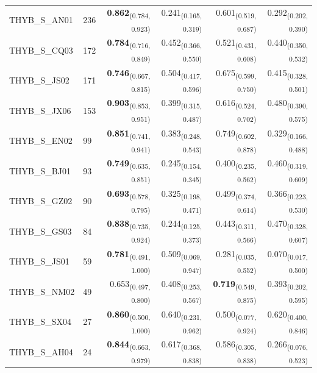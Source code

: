 \begin{table}[p]
\begin{tabular}{llrrrr}
THYB\_S\_AN01 & 236 & \textbf{0.862}\textsubscript{(0.784, 0.923)} & 0.241\textsubscript{(0.165, 0.319)} & 0.601\textsubscript{(0.519, 0.687)} & 0.292\textsubscript{(0.202, 0.390)} \\
THYB\_S\_CQ03 & 172 & \textbf{0.784}\textsubscript{(0.716, 0.849)} & 0.452\textsubscript{(0.366, 0.550)} & 0.521\textsubscript{(0.431, 0.608)} & 0.440\textsubscript{(0.350, 0.532)} \\
THYB\_S\_JS02 & 171 & \textbf{0.746}\textsubscript{(0.667, 0.815)} & 0.504\textsubscript{(0.417, 0.596)} & 0.675\textsubscript{(0.599, 0.750)} & 0.415\textsubscript{(0.328, 0.501)} \\
THYB\_S\_JX06 & 153 & \textbf{0.903}\textsubscript{(0.853, 0.951)} & 0.399\textsubscript{(0.315, 0.487)} & 0.616\textsubscript{(0.524, 0.702)} & 0.480\textsubscript{(0.390, 0.575)} \\
THYB\_S\_EN02 & 99 & \textbf{0.851}\textsubscript{(0.741, 0.941)} & 0.383\textsubscript{(0.248, 0.543)} & 0.749\textsubscript{(0.602, 0.878)} & 0.329\textsubscript{(0.166, 0.488)} \\
THYB\_S\_BJ01 & 93 & \textbf{0.749}\textsubscript{(0.635, 0.851)} & 0.245\textsubscript{(0.154, 0.345)} & 0.400\textsubscript{(0.235, 0.562)} & 0.460\textsubscript{(0.319, 0.609)} \\
THYB\_S\_GZ02 & 90 & \textbf{0.693}\textsubscript{(0.578, 0.795)} & 0.325\textsubscript{(0.198, 0.471)} & 0.499\textsubscript{(0.374, 0.614)} & 0.366\textsubscript{(0.223, 0.530)} \\
THYB\_S\_GS03 & 84 & \textbf{0.838}\textsubscript{(0.735, 0.924)} & 0.244\textsubscript{(0.125, 0.373)} & 0.443\textsubscript{(0.311, 0.566)} & 0.470\textsubscript{(0.328, 0.607)} \\
THYB\_S\_JS01 & 59 & \textbf{0.781}\textsubscript{(0.491, 1.000)} & 0.509\textsubscript{(0.069, 0.947)} & 0.281\textsubscript{(0.035, 0.552)} & 0.070\textsubscript{(0.017, 0.500)} \\
THYB\_S\_NM02 & 49 & 0.653\textsubscript{(0.497, 0.800)} & 0.408\textsubscript{(0.253, 0.567)} & \textbf{0.719}\textsubscript{(0.549, 0.875)} & 0.393\textsubscript{(0.202, 0.595)} \\
THYB\_S\_SX04 & 27 & \textbf{0.860}\textsubscript{(0.500, 1.000)} & 0.640\textsubscript{(0.231, 0.962)} & 0.500\textsubscript{(0.077, 0.924)} & 0.620\textsubscript{(0.400, 0.846)} \\
THYB\_S\_AH04 & 24 & \textbf{0.844}\textsubscript{(0.663, 0.979)} & 0.617\textsubscript{(0.368, 0.838)} & 0.586\textsubscript{(0.305, 0.838)} & 0.266\textsubscript{(0.076, 0.523)} \\

\end{tabular}
\end{table}
